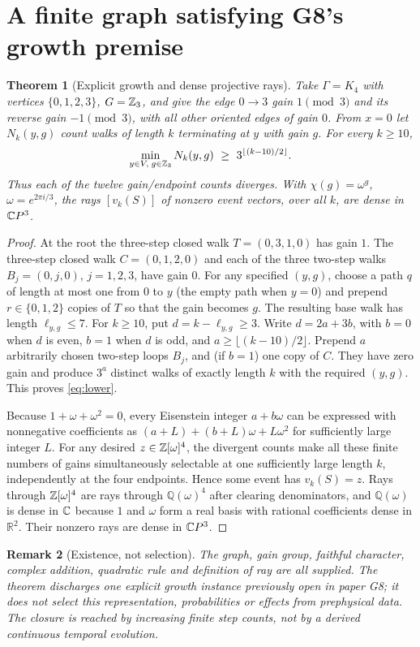 \documentclass[11pt]{article}
\newtheorem{theorem}{Theorem}
\newtheorem{remark}[theorem]{Remark}
\begin{document}
\section{A finite graph satisfying G8's growth premise}
\begin{theorem}[Explicit growth and dense projective rays]\label{thm:growth}
Take $\Gamma=K_4$ with vertices $\{0,1,2,3\}$, $G=\mathbb Z_3$, and give the edge $0\to3$ gain $1\pmod3$ and its reverse gain $-1\pmod3$, with all other oriented edges of gain $0$. From $x=0$ let $N_k(y,g)$ count walks of length $k$ terminating at $y$ with gain $g$. For every $k\ge10$,
\begin{equation}\label{eq:lower}
 \min_{y\in V,\;g\in\ZZ_3}N_k(y,g)\ \ge\ 3^{\lfloor(k-10)/2\rfloor}.
\end{equation}
Thus each of the twelve gain/endpoint counts diverges. With $\chi(g)=\omega^g$, $\omega=e^{2\pi i/3}$, the rays $[v_k(S)]$ of nonzero event vectors, over all $k$, are dense in $\mathbb C P^3$.
\end{theorem}
\begin{proof}
At the root the three-step closed walk $T=(0,3,1,0)$ has gain $1$. The three-step closed walk $C=(0,1,2,0)$ and each of the three two-step walks $B_j=(0,j,0)$, $j=1,2,3$, have gain $0$. For any specified $(y,g)$, choose a path $q$ of length at most one from $0$ to $y$ (the empty path when $y=0$) and prepend $r\in\{0,1,2\}$ copies of $T$ so that the gain becomes $g$. The resulting base walk has length $\ell_{y,g}\le7$. For $k\ge10$, put $d=k-\ell_{y,g}\ge3$. Write $d=2a+3b$, with $b=0$ when $d$ is even, $b=1$ when $d$ is odd, and $a\ge\lfloor(k-10)/2\rfloor$. Prepend $a$ arbitrarily chosen two-step loops $B_j$, and (if $b=1$) one copy of $C$. They have zero gain and produce $3^a$ distinct walks of exactly length $k$ with the required $(y,g)$. This proves \eqref{eq:lower}.

Because $1+\omega+\omega^2=0$, every Eisenstein integer $a+b\omega$ can be expressed with nonnegative coefficients as $(a+L)+(b+L)\omega+L\omega^2$ for sufficiently large integer $L$. For any desired $z\in\mathbb Z[\omega]^4$, the divergent counts make all these finite numbers of gains simultaneously selectable at one sufficiently large length $k$, independently at the four endpoints. Hence some event has $v_k(S)=z$. Rays through $\mathbb Z[\omega]^4$ are rays through $\mathbb Q(\omega)^4$ after clearing denominators, and $\mathbb Q(\omega)$ is dense in $\mathbb C$ because $1$ and $\omega$ form a real basis with rational coefficients dense in $\mathbb R^2$. Their nonzero rays are dense in $\mathbb C P^3$.
\end{proof}
\begin{remark}[Existence, not selection]
The graph, gain group, faithful character, complex addition, quadratic rule and definition of ray are all supplied. The theorem discharges \emph{one explicit growth instance} previously open in paper G8; it does not select this representation, probabilities or effects from prephysical data. The closure is reached by increasing finite step counts, not by a derived continuous temporal evolution.
\end{remark}
\end{document}
